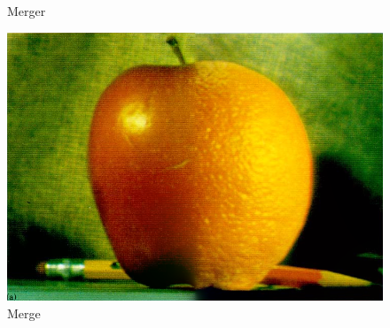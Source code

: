 \documentclass{article}
\begin{document}
    \pagebreak
    \begin{figure}[!htb]
      \caption{Merger}
    \endminipage \hfill
      \includegraphics[scale=.3]{./blending/ao/final_1.png}
      \caption{Merge}
    \endminipage \hfill
    \end{figure}

    
\end{document}

